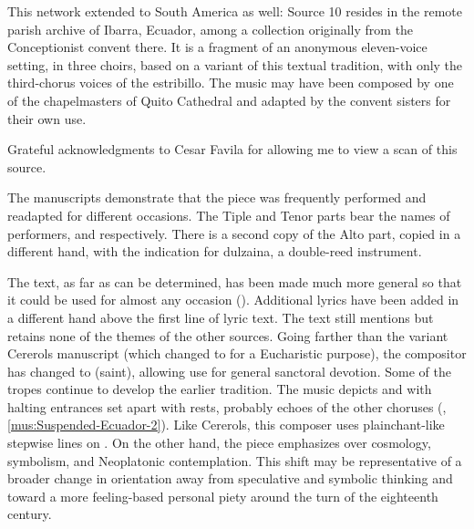 
This network extended to South America as well: Source 10 resides in the remote
parish archive of Ibarra, Ecuador, among a collection originally from the
Conceptionist convent there.
It is a fragment of an anonymous eleven-voice setting, in three choirs, based on
a variant of this textual tradition, with only the third-chorus voices of the
estribillo.
The music may have been composed by one of the chapelmasters of Quito Cathedral
and adapted by the convent sisters for their own use.%
\begin{Footnote}
    Grateful acknowledgments to Cesar Favila for allowing me to view a scan of
    this source.
\end{Footnote}
The manuscripts demonstrate that the piece was frequently performed and
readapted for different occasions.
The Tiple and Tenor parts bear the names of performers, 
and  respectively.
There is a second copy of the Alto part, copied in a different hand, with the
indication for dulzaina, a double-reed instrument.


The text, as far as can be determined, has been made much more general so that
it could be used for almost any occasion ().
Additional lyrics have been added in a different hand above the first line of
lyric text.
The text still mentions  but retains none of the themes of the
other sources.
Going farther than the variant Cererols manuscript (which changed 
to  for a Eucharistic purpose), the compositor has changed
 to  (saint), allowing use for general sanctoral
devotion.
Some of the tropes continue to develop the earlier tradition.
The music depicts  and  with halting
entrances set apart with rests, probably echoes of the other choruses
(, \ref{mus:Suspended-Ecuador-2}).
Like Cererols, this composer uses plainchant-like stepwise lines on .
On the other hand, the piece emphasizes  over
cosmology, symbolism, and Neoplatonic contemplation.
This shift may be representative of a broader change in orientation away from
speculative and symbolic thinking and toward a more feeling-based personal
piety around the turn of the eighteenth century.

